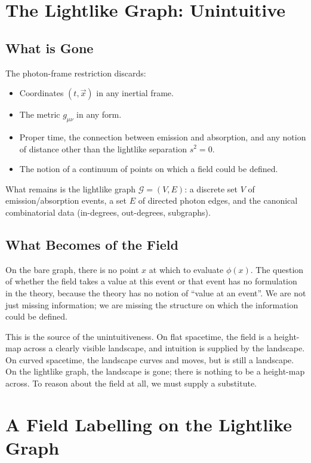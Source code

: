 \documentclass[11pt]{article}
\begin{document}
\section{The Lightlike Graph: Unintuitive}
\label{sec:graph}

\subsection{What is Gone}

The photon-frame restriction discards:
\begin{itemize}
    \item Coordinates $(t, \vec{x})$ in any inertial frame.
    \item The metric $g_{\mu\nu}$ in any form.
    \item Proper time, the connection between emission and absorption, and any notion of distance other than the lightlike separation $s^2 = 0$.
    \item The notion of a continuum of points on which a field could be defined.
\end{itemize}
What remains is the lightlike graph $\mathcal{G} = (V, E)$: a discrete set $V$ of emission/absorption events, a set $E$ of directed photon edges, and the canonical combinatorial data (in-degrees, out-degrees, subgraphs).

\subsection{What Becomes of the Field}

On the bare graph, there is no point $x$ at which to evaluate $\phi(x)$. The question of whether the field takes a value at this event or that event has no formulation in the theory, because the theory has no notion of ``value at an event''. We are not just missing information; we are missing the structure on which the information could be defined.

This is the source of the unintuitiveness. On flat spacetime, the field is a height-map across a clearly visible landscape, and intuition is supplied by the landscape. On curved spacetime, the landscape curves and moves, but is still a landscape. On the lightlike graph, the landscape is gone; there is nothing to be a height-map across. To reason about the field at all, we must supply a substitute.

\section{A Field Labelling on the Lightlike Graph}
\label{sec:labelling}
\end{document}

